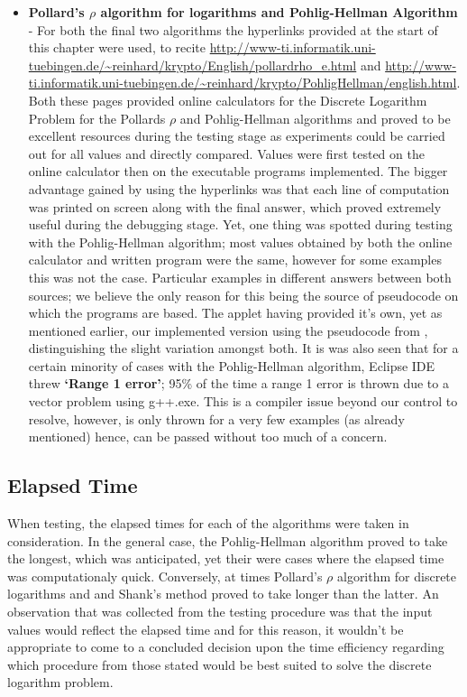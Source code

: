 \documentclass[iwp,first]{luthesis}
\begin{document}
\begin{itemize}
\item \textbf{Pollard's $\rho$ algorithm for logarithms and Pohlig-Hellman Algorithm} - For both the final two algorithms the hyperlinks provided at the start of this chapter were used, to recite \url{http://www-ti.informatik.uni-tuebingen.de/~reinhard/krypto/English/pollardrho_e.html} and \url{http://www-ti.informatik.uni-tuebingen.de/~reinhard/krypto/PohligHellman/english.html}. Both these pages provided  online calculators for the Discrete Logarithm Problem for the Pollards $\rho$ and Pohlig-Hellman algorithms and proved to be excellent resources during the testing stage as experiments could be carried out for all values and directly compared. Values were first tested on the online calculator then on the executable programs implemented. The bigger advantage gained by using the hyperlinks was that each line of computation was printed on screen along with the final answer, which proved extremely useful during the debugging stage. Yet, one thing was spotted during testing with the Pohlig-Hellman algorithm; most values obtained by both the online calculator and written program were the same, however for some examples this was not the case. Particular examples in different answers between both sources; we believe the only reason for this being the source of pseudocode on which the programs are based. The applet having provided it's own, yet as mentioned earlier, our implemented version using the pseudocode from \cite{HAC}, distinguishing the slight variation amongst both. It is was also seen that for a certain minority of cases with the Pohlig-Hellman algorithm, Eclipse IDE threw \textbf{`Range 1 error'}; 95\% of the time a range 1 error is thrown due to a vector problem using g++.exe. This is a compiler issue beyond our control to resolve, however, is only thrown for a very few examples (as already mentioned) hence, can be passed without too much of a concern.



\end{itemize}




\subsection{Elapsed Time}

When testing, the elapsed times for each of the algorithms were taken in consideration. In the general case, the Pohlig-Hellman algorithm proved to take the longest, which was anticipated, yet their were cases where the elapsed time was computationaly quick. Conversely, at times Pollard's $\rho$ algorithm for discrete logarithms and and Shank's method proved to take longer than the latter. An observation that was collected from the testing procedure was that the input values would reflect the elapsed time and for this reason, it wouldn't be appropriate to come to a  concluded decision upon the time efficiency regarding which procedure from those stated would be best suited to solve the discrete logarithm problem.
\end{document}
